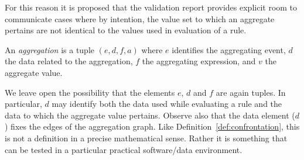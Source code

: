 For this reason it is proposed that the validation report provides explicit
room to communicate cases where by intention, the value set to which an
aggregate pertains are not identical to the values used in evaluation of a
rule. 
%
\begin{definition}[aggregation]
\label{def:aggregation}
An \emph{aggregation} is a tuple  
$(e, d, f, a)$
where $e$ identifies the aggregating event, $d$ the data related to the
aggregation, $f$ the aggregating expression, and $v$ the aggregate value.
\end{definition}
We leave open the possibility that the elements $e$, $d$ and $f$ are again
tuples. In particular, $d$ may identify both the data used while evaluating a
rule and the data to which the aggregate value pertains.  Observe also that the
data element ($d$) fixes the edges of the aggregation graph.  Like
Definition~\ref{def:confrontation}, this is not a definition in a precise
mathematical sense. Rather it is something that can be tested in a particular
practical software/data environment. 


